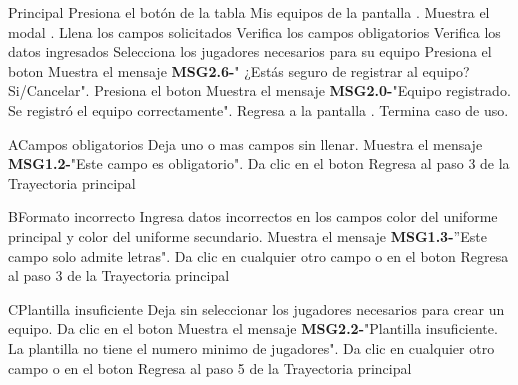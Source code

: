 	\begin{UCtrayectoria}{Principal}
	\UCpaso[\UCactor] Presiona el botón \IUbutton{ + } de la tabla Mis equipos de la pantalla .
	\UCpaso Muestra el modal . 
	\UCpaso[\UCactor] Llena los campos solicitados
	\UCpaso Verifica los campos obligatorios  
	\UCpaso Verifica los datos ingresados  
	\UCpaso [\UCactor]  Selecciona los jugadores necesarios para su equipo 
	\UCpaso[\UCactor] Presiona el boton  
	\UCpaso Muestra el mensaje {\bf MSG2.6-}" ¿Estás seguro de registrar al equipo? Si/Cancelar".
	\UCpaso[\UCactor] Presiona el boton  
	\UCpaso Muestra el mensaje {\bf MSG2.0-}"Equipo registrado. Se registró el equipo correctamente".
	\UCpaso Regresa a la pantalla .
	\UCpaso Termina caso de uso.
\end{UCtrayectoria}

\begin{UCtrayectoriaA}{A}{Campos obligatorios}
	\UCpaso[\UCactor] Deja uno o mas campos sin llenar.
	\UCpaso Muestra el mensaje {\bf MSG1.2-}"Este campo es obligatorio".
	\UCpaso[\UCactor] Da clic en el boton 
	\UCpaso Regresa al paso 3 de la Trayectoria principal
\end{UCtrayectoriaA}

\begin{UCtrayectoriaA}{B}{Formato incorrecto}
	\UCpaso[\UCactor] Ingresa datos incorrectos en los campos color del uniforme principal y color del uniforme secundario.
	\UCpaso Muestra el mensaje {\bf MSG1.3-}''Este campo solo admite letras".
	\UCpaso[\UCactor] Da clic en cualquier otro campo o en el boton 
	\UCpaso Regresa al paso 3 de la Trayectoria principal
\end{UCtrayectoriaA}

\begin{UCtrayectoriaA}{C}{Plantilla insuficiente}
	\UCpaso[\UCactor] Deja sin seleccionar los jugadores necesarios para crear un equipo.
	\UCpaso[\UCactor] Da clic en el boton 
	\UCpaso Muestra el mensaje {\bf MSG2.2-}"Plantilla insuficiente. La plantilla no tiene el numero minimo de jugadores".
	\UCpaso[\UCactor] Da clic en cualquier otro campo o en el boton 
	\UCpaso Regresa al paso 5 de la Trayectoria principal
\end{UCtrayectoriaA}

